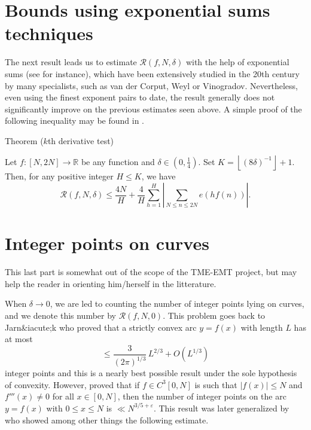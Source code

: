 \section{Bounds using exponential sums techniques
}


The next result leads us to estimate $\mathcal {R}(f,N,\delta)$ with the help
of exponential sums (see 
\cite{Graham-Kolesnik*91}
for instance), which have been extensively
studied in the 20th century by many specialists, such as van der Corput,
Weyl or Vinogradov. Nevertheless, even using the finest exponent pairs to
date, the result generally does not significantly improve on the previous
estimates seen above. A simple proof of the following inequality may be found
in 
\cite{Filaseta*90}.

\begin{thm}{Theorem ($k$th derivative test)}

Let $f : [N,2N] \longrightarrow \mathbb {R}$ be any function and $\delta \in
  \left( 0,\frac{1}{4} \right)$. Set $K = \left \lfloor (8 \delta)^{-1} \right
  \rfloor +1$. Then, for any positive integer $H \leqslant K$, we have 
$$\mathcal {R}(f,N,\delta) \leqslant \frac{4N}{H} + \frac{4}{H} \sum_{h=1}^{H}
  \left | \sum_{N \leqslant n \leqslant 2N} e(hf(n)) \right |.$$ 
\end{thm}




\section{Integer points on curves
}



This last part is somewhat out of the scope of the TME-EMT project, but may
help the reader in orienting him/herself in the litterature.


When $\delta \longrightarrow 0$, we are led to counting the number of integer
points lying on curves, and we denote this number by $\mathcal
{R}(f,N,0)$. This problem goes back to Jarn&iacute;k
\cite{Jarnik*25}
who proved that a
strictly convex arc $y=f(x)$ with length $L$ has at most 
$$\leqslant \frac{3}{(2 \pi)^{1/3}} \, L^{2/3} + O \left( L^{1/3} \right)$$ 
integer points and this is a nearly best possible result under the sole
hypothesis of convexity. However, 
\cite{Swinnerton-Dyer*74}
proved that if $f
\in C^3[0,N]$ is such that $|f(x)| \leqslant N$ and $f'''(x) \neq 0$ for all
$x \in [0,N]$, then the number of integer points on the arc $y=f(x)$ with $0
\leqslant x \leqslant N$ is $\ll N^{3/5+\varepsilon}$. This result was later
generalized by
\cite{Bombieri-Pila*89}
who showed among
other things the following estimate.  

